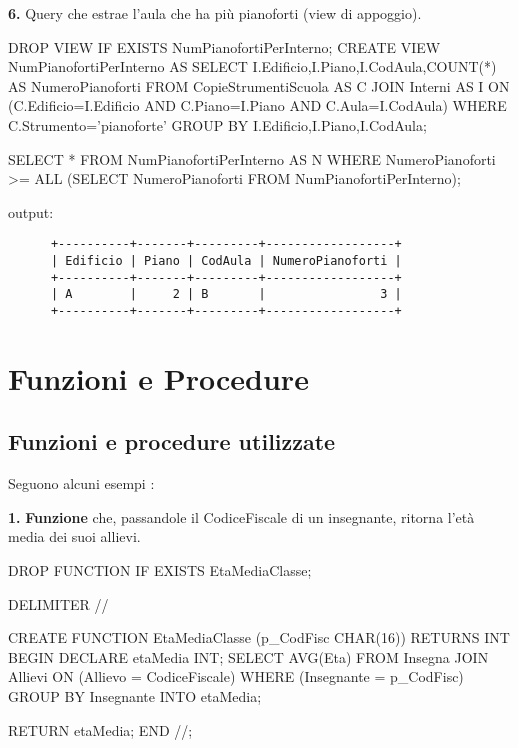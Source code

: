 \documentclass{article}
\begin{document}
\begin{flushleft}
\textbf{6.} Query che estrae l'aula che ha più pianoforti (view di appoggio).

\end{flushleft}

\begin{sql}[float=h]
DROP VIEW IF EXISTS NumPianofortiPerInterno;
CREATE VIEW NumPianofortiPerInterno AS	
SELECT I.Edificio,I.Piano,I.CodAula,COUNT(*) AS NumeroPianoforti
FROM CopieStrumentiScuola AS C JOIN Interni AS I ON (C.Edificio=I.Edificio AND C.Piano=I.Piano AND C.Aula=I.CodAula)
WHERE C.Strumento='pianoforte'
GROUP BY I.Edificio,I.Piano,I.CodAula;

SELECT * FROM NumPianofortiPerInterno AS N
WHERE NumeroPianoforti >= ALL (SELECT NumeroPianoforti FROM NumPianofortiPerInterno);
\end{sql}

\begin{flushleft}
output:
\end{flushleft}

\begin{verbatim}
      +----------+-------+---------+------------------+
      | Edificio | Piano | CodAula | NumeroPianoforti |
      +----------+-------+---------+------------------+
      | A        |     2 | B       |                3 |
      +----------+-------+---------+------------------+
\end{verbatim}

\newpage

\section{Funzioni e Procedure}

\subsection{Funzioni e procedure utilizzate}

Seguono alcuni esempi :\bigskip

\begin{flushleft}
\textbf{1.} \textbf{Funzione} che, passandole il CodiceFiscale di un insegnante, ritorna l'età media dei suoi allievi.
\end{flushleft}

\begin{sql}[float=h]
DROP FUNCTION IF EXISTS EtaMediaClasse;

DELIMITER //

CREATE FUNCTION EtaMediaClasse (p_CodFisc CHAR(16)) RETURNS INT
BEGIN
	DECLARE etaMedia INT;
	SELECT AVG(Eta) 
	FROM Insegna JOIN Allievi ON (Allievo = CodiceFiscale) 
	WHERE (Insegnante = p_CodFisc)
	GROUP BY Insegnante
	INTO etaMedia;

 	RETURN etaMedia;
END //;
\end{sql}
\end{document}
